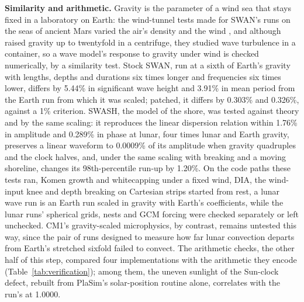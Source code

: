 \textbf{Similarity and arithmetic.} Gravity is the parameter of a wind sea that stays fixed in a laboratory on
Earth: the wind-tunnel tests made for SWAN's runs on the seas of ancient Mars varied the air's density and the wind
\autocite{banfield2015winds}, and although \textcite{cazaubiel2019wave} raised gravity up to twentyfold in a
centrifuge, they studied wave turbulence in a container, so a wave model's response to gravity under wind is
checked numerically, by a similarity test. Stock SWAN, run at a
sixth of Earth's gravity with lengths, depths and durations six times longer and frequencies six times lower,
differs by 5.44\% in significant wave height and 3.91\% in mean period from the Earth run from which it was scaled; patched, it
differs by 0.303\% and 0.326\%, against a 1\% criterion. SWASH, the model of the shore, was tested against theory and by the same
scaling: it reproduces the linear dispersion relation within 1.76\% in amplitude and 0.289\% in phase at lunar, four times lunar and Earth gravity, preserves
a linear waveform to 0.0009\% of its amplitude when gravity quadruples and the clock halves, and, under the same
scaling with breaking and a moving shoreline, changes its 98th-percentile run-up by 1.20\%. On the
code paths these tests ran, Komen growth and whitecapping under a fixed wind, DIA, the wind-input knee and
depth breaking on Cartesian strips started from rest, a lunar wave run is an Earth run scaled in gravity with
Earth's coefficients, while the lunar runs' spherical grids, nests and GCM forcing were checked separately or left
unchecked. CM1's gravity-scaled microphysics, by contrast, remains untested this way, since the pair of runs designed to
measure how far lunar convection departs from Earth's stretched sixfold failed to convect. The arithmetic
checks, the other half of this step, compared four implementations with the arithmetic they encode
(Table~\ref{tab:verification}); among them, the uneven sunlight of the Sun-clock defect, rebuilt from PlaSim's
solar-position routine alone, correlates with the run's at 1.0000.


